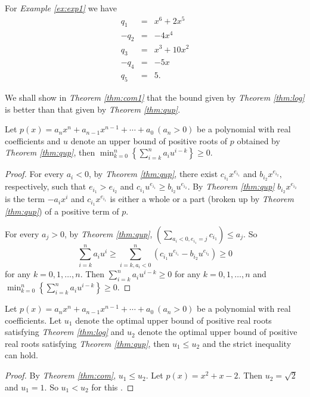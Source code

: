 For {\em Example \ref{ex:exp1}} we have
  \begin{eqnarray*}
 q_1&=&x^6+2x^5\\  	
 -q_2&=& -4x^4\\
 q_3&=& x^3+10x^2\\
 -q_4&=& -5x\\
 q_5&=&5.
  	\end{eqnarray*}




We shall show in {\em Theorem \ref{thm:com1}} that the bound given by {\em Theorem \ref{thm:log}} is better than that given by {\em Theorem \ref{thm:qup}}.









\begin{theorem}\label{thm:com}
	Let $p(x)=a_nx^n+a_{n-1}x^{n-1}+\cdots+a_0\ (a_n>0)$ be a polynomial with real coefficients and   $u$ denote an upper bound of positive roots of $p$ obtained by {\em Theorem \ref{thm:qup}}, then $\min_{k=0}^{n}\left\{  \sum_{i=k}^n a_i u^{i-k}\right\}\ge0$.
	
\end{theorem}

\begin{proof}

	For every $ a_i<0$, by {\em Theorem \ref{thm:qup}}, there exist  $c_{i_1}x^{e_{i_1}}$ and $b_{i_2}x^{e_{i_2}},$  respectively, such that
	$e_{i_1}>e_{i_2}$ and $c_{i_1}u^{e_{i_1}}\ge b_{i_2}u^{e_{i_2}}$. By  {\em Theorem \ref{thm:qup}} $b_{i_2}x^{e_{i_2} }$ is the term $-a_ix^i$
	and $c_{i_1}x^{e_{i_1} }$ is either a whole or a part (broken up by {\em Theorem \ref{thm:qup}}) of a positive term of $p$.
	
	For every  $a_j>0$, by {\em Theorem \ref{thm:qup}}, $\left( \sum_{a_i<0,e_{i_1}=j }c_{i_1} \right)\le a_{j}$. So \begin{dmath*}\sum_{i=k}^na_iu^i\ge \sum_{i=k,a_i<0}^n \left( c_{i_1}u^{e_{i_1}}-
		b_{i_2}u^{e_{i_2}} \right)\ge 0 \end{dmath*} for any $k= 0,1,\ldots,n$. Then $\sum_{i=k}^n a_i u^{i-k}\ge0 $ for any  $k= 0,1,\ldots,n$ and
	$\min_{k=0}^{n}\left\{  \sum_{i=k}^n a_i u^{i-k}\right\}\ge0$.
\end{proof}

\begin{theorem}\label{thm:com1}
	
	Let $p(x)=a_nx^n+a_{n-1}x^{n-1}+\cdots+a_0\ (a_n>0)$ be a polynomial with real coefficients. Let  $u_1$ denote the optimal upper bound of
	positive real roots satisfying {\em Theorem \ref{thm:log}} and $u_2$ denote the optimal upper bound of positive real roots satisfying {\em Theorem \ref{thm:qup}}, then $u_1\le u_2$ and the  strict inequality can hold.
\end{theorem}

\begin{proof}
	By {\em Theorem \ref{thm:com}}, $u_1\le u_2$.
	Let $p(x)=x^2+x-2$. Then $u_2=\sqrt{2}$ and $u_1=1$. So
	$u_1<u_2$ for this .
\end{proof}

